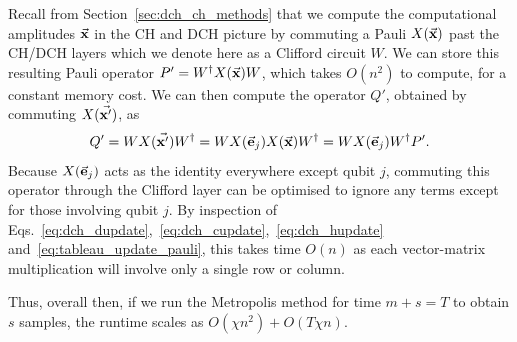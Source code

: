 Recall from Section~\ref{sec:dch_ch_methods} that we compute the computational amplitudes $\va{x}$ in the CH and DCH picture by commuting a Pauli $X(\va{x})$ past the CH/DCH layers which we denote here as a Clifford circuit $W$. We can store this resulting Pauli operator $P'=W^{\dagger}X(\va{x})W$, which takes $O(n^{2})$ to compute, for a constant memory cost. We can then compute the operator $Q'$, obtained by commuting $X(\va{x'})$, as
\[Q' = WX(\va{x'})W^{\dagger} = WX(\va{e}_{j})X(\va{x})W^{\dagger} = WX(\va{e}_{j})W^{\dagger} P'.\]
Because $X(\va{e}_{j})$ acts as the identity everywhere except qubit $j$, commuting this operator through the Clifford layer can be optimised to ignore any terms except for those involving qubit $j$. By inspection of Eqs.~\ref{eq:dch_dupdate},~\ref{eq:dch_cupdate},~\ref{eq:dch_hupdate} and~\ref{eq:tableau_update_pauli}, this takes time $O(n)$ as each vector-matrix multiplication will involve only a single row or column.\par
Thus, overall then, if we run the Metropolis method for time $m+s=T$ to obtain $s$ samples, the runtime scales as $O\left(\chi n^{2}\right)+O\left(T\chi n\right)$.
